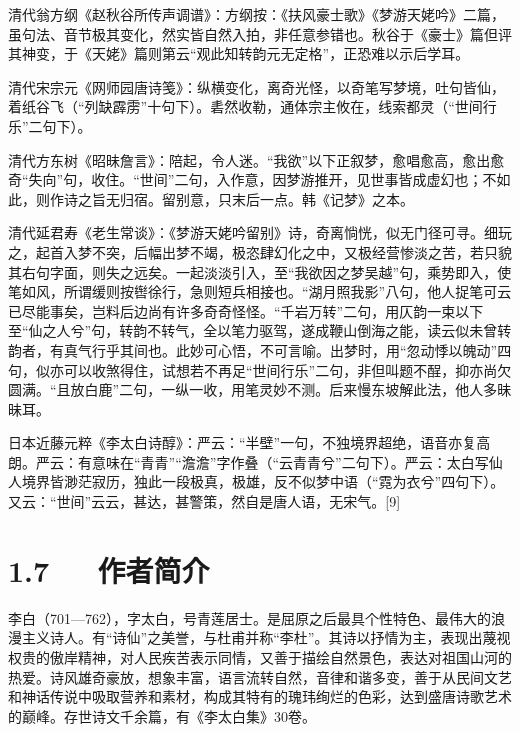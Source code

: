 \documentclass[letterpaper,12pt,english]{sphinxmanual}
\begin{document}
清代翁方纲《赵秋谷所传声调谱》：方纲按：《扶风豪士歌》《梦游天姥吟》二篇，虽句法、音节极其变化，然实皆自然入拍，非任意参错也。秋谷于《豪士》篇但评其神变，于《天姥》篇则第云“观此知转韵元无定格”，正恐难以示后学耳。

清代宋宗元《网师园唐诗笺》：纵横变化，离奇光怪，以奇笔写梦境，吐句皆仙，着纸谷飞（“列缺霹雳”十句下）。砉然收勒，通体宗主攸在，线索都灵（“世间行乐”二句下）。

清代方东树《昭昧詹言》：陪起，令人迷。“我欲”以下正叙梦，愈唱愈高，愈出愈奇“失向”句，收住。“世间”二句，入作意，因梦游推开，见世事皆成虚幻也；不如此，则作诗之旨无归宿。留别意，只末后一点。韩《记梦》之本。

清代延君寿《老生常谈》：《梦游天姥吟留别》诗，奇离惝恍，似无门径可寻。细玩之，起首入梦不突，后幅出梦不竭，极恣肆幻化之中，又极经营惨淡之苦，若只貌其右句字面，则失之远矣。一起淡淡引入，至“我欲因之梦吴越”句，乘势即入，使笔如风，所谓缓则按辔徐行，急则短兵相接也。“湖月照我影”八句，他人捉笔可云已尽能事矣，岂料后边尚有许多奇奇怪怪。“千岩万转”二句，用仄韵一束以下至“仙之人兮”句，转韵不转气，全以笔力驱驾，遂成鞭山倒海之能，读云似未曾转韵者，有真气行乎其间也。此妙可心悟，不可言喻。出梦时，用“忽动悸以魄动”四句，似亦可以收煞得住，试想若不再足“世间行乐”二句，非但叫题不酲，抑亦尚欠圆满。“且放白鹿”二句，一纵一收，用笔灵妙不测。后来慢东坡解此法，他人多昧昧耳。

日本近藤元粹《李太白诗醇》：严云：“半壁”一句，不独境界超绝，语音亦复高朗。严云：有意味在“青青”“澹澹”字作叠（“云青青兮”二句下）。严云：太白写仙人境界皆渺茫寂历，独此一段极真，极雄，反不似梦中语（“霓为衣兮”四句下）。又云：“世间”云云，甚达，甚警策，然自是唐人语，无宋气。{[}9{]}


\section{1.7   作者简介}
\label{\detokenize{p01_u6563_u6587/_u674e_u767d-_u68a6_u6e38_u5929_u59e5_u541f_u7559_u522b:id9}}
李白（701—762），字太白，号青莲居士。是屈原之后最具个性特色、最伟大的浪漫主义诗人。有“诗仙”之美誉，与杜甫并称“李杜”。其诗以抒情为主，表现出蔑视权贵的傲岸精神，对人民疾苦表示同情，又善于描绘自然景色，表达对祖国山河的热爱。诗风雄奇豪放，想象丰富，语言流转自然，音律和谐多变，善于从民间文艺和神话传说中吸取营养和素材，构成其特有的瑰玮绚烂的色彩，达到盛唐诗歌艺术的巅峰。存世诗文千余篇，有《李太白集》30卷。
\end{document}
